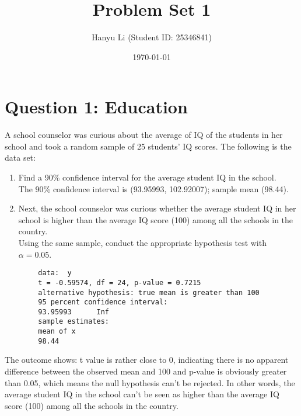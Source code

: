 \documentclass[12pt,letterpaper]{article}
\title{Problem Set 1}
\date{\today}
\author{Hanyu Li (Student ID: 25346841)}
\begin{document}
	\maketitle
	
	\section*{Question 1: Education}
	
	A school counselor was curious about the average of IQ of the students in her school and took a random sample of 25 students' IQ scores. The following is the data set:
	
	\vspace{.5cm}
	
	  
	
	\vspace{1cm}
	
	\begin{enumerate}
		\item Find a 90\% confidence interval for the average student IQ in the school.\\
		
		 
		
		The 90\% confidence interval is (93.95993, 102.92007); sample mean (98.44).
		
		\item Next, the school counselor was curious whether the average student IQ in her school is higher than the average IQ score (100) among all the schools in the country.\\ 
		
		\noindent Using the same sample, conduct the appropriate hypothesis test with $\alpha=0.05$.
	\end{enumerate}
	
	
	
	\begin{verbatim}
		data:  y
		t = -0.59574, df = 24, p-value = 0.7215
		alternative hypothesis: true mean is greater than 100
		95 percent confidence interval:
		93.95993      Inf
		sample estimates:
		mean of x 
		98.44 
	\end{verbatim} 
	
	The outcome shows: t value is rather close to 0, indicating there is no apparent difference between the observed mean and 100 and p-value is obviously greater than 0.05, which means the null hypothesis can't be rejected. In other words, the average student IQ in the school can't be seen as higher than the average IQ score (100) among all the schools in the country.
	
\end{document}
